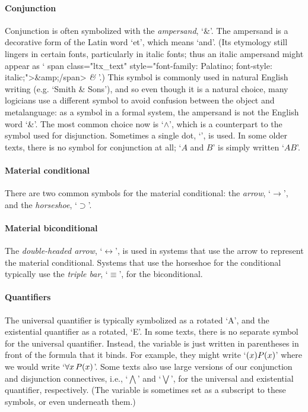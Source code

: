 \paragraph{Conjunction}
Conjunction is often symbolized with the \emph{ampersand}, `{\&}'. The ampersand is a decorative form of the Latin word `et', which means `and'.  (Its etymology still lingers in certain fonts, particularly in italic fonts; thus an italic ampersand might appear as `%
\ifHTMLtarget
\<span class="ltx_text" style="font-family: Palatino; font-style:
italic;">&amp;\</span>
\else
\emph{\&}
\fi
'.) This symbol is commonly used in natural English writing (e.g.  `Smith \& Sons'), and so even though it is a natural choice, many logicians use a different symbol to avoid confusion between the object and metalanguage: as a symbol in a formal system, the ampersand is not the English word `\&'. The most common choice now is `$\wedge$', which is a counterpart to the symbol used for disjunction. Sometimes a single dot, `{\scriptsize\textbullet}', is used. In some older texts, there is no symbol for conjunction at all; `$A$ and $B$' is simply written `$AB$'.

\paragraph{Material conditional} There are two common symbols for the material conditional: the \emph{arrow}, `$\rightarrow$', and the \emph{horseshoe}, `$\supset$'.

\paragraph{Material biconditional} The \emph{double-headed arrow}, `$\leftrightarrow$', is used in systems that use the arrow to represent the material conditional. Systems that use the horseshoe for the conditional typically use the \emph{triple bar}, `$\equiv$', for the biconditional.

\paragraph{Quantifiers} The universal quantifier is typically
symbolized as a rotated `A', and the existential quantifier as a
rotated, `E'. In some texts, there is no separate symbol for the
universal quantifier. Instead, the variable is just written in
parentheses in front of the formula that it binds. For example, they
might write `$(x)\mathord{P}(x)$' where we would write `$\forall x\,
\mathord{P}(x)$'. Some texts also use large versions of our conjunction
and disjunction connectives, i.e., `$\bigwedge$' and `$\bigvee$', for
the universal and existential quantifier, respectively. (The variable
is sometimes set as a subscript to these symbols, or even underneath
them.)

